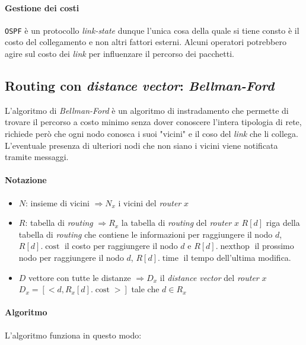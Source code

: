         \paragraph{Gestione dei costi} \texttt{OSPF} è un protocollo \textit{link-state} dunque l'unica cosa della quale si tiene consto è il costo del collegamento e non altri fattori esterni. Alcuni operatori potrebbero agire sul costo dei \textit{link} per influenzare il percorso dei pacchetti.
    \subsection{Routing con \textit{distance vector}: \textit{Bellman-Ford}}
        L'algoritmo di \textit{Bellman-Ford} è un algoritmo di instradamento che permette di trovare il percorso a costo minimo senza dover conoscere l'intera tipologia di rete, richiede però che ogni nodo conosca i suoi "vicini" e il coso del \textit{link} che li collega. L'eventuale presenza di ulteriori nodi che non siano i vicini viene notificata tramite messaggi.
        \paragraph{Notazione} \begin{itemize}
            \item $N$: insieme di vicini $\Rightarrow N_x$ i vicini del \textit{router} $x$
            \item $R$: tabella di \textit{routing} $\Rightarrow R_x$ la tabella di \textit{routing} del \textit{router} $x$
                \subitem $R[d]$ riga della tabella di \textit{routing} che contiene le informazioni per raggiungere il nodo $d$, $R[d].\operatorname{cost}$ il costo per raggiungere il nodo $d$ e $R[d].\operatorname{nexthop}$ il prossimo nodo per raggiungere il nodo $d$, $R[d].\operatorname{time}$ il tempo dell'ultima modifica.
            \item $D$ vettore con tutte le distanze $\Rightarrow D_x$ il \textit{distance vector} del \textit{router} $x$
                \subitem $D_x=[<d,R_x[d].\operatorname{cost}>]$ tale che $d\in R_x$
        \end{itemize}
        \paragraph{Algoritmo} L'algoritmo funziona in questo modo:

